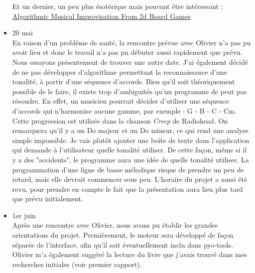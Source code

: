 \documentclass[letterpaper,12pt]{scrartcl}
\begin{document}
\begin{itemize}
Et un dernier, un peu plus ésotérique mais pouvant être intéressant : \href{http://quod.lib.umich.edu/cgi/p/pod/dod-idx/algorithmic-musical-improvisation-from-2d-board-games.pdf?c=icmc;idno=bbp2372.2010.061}{Algorithmic Musical Improvisation From 2d Board Games}\\
	\item 20 mai \\
	En raison d'un problème de santé, la rencontre prévue avec Olivier n'a pas pu avoir lieu et donc le travail n'a pas pu débuter aussi rapidement que prévu. Nous essayons présentement de trouver une autre date. J'ai également décidé de ne pas développer d'algorithme permettant la reconnaissance d'une tonalité, à partir d'une séquence d'accords. Bien qu'il soit théoriquement possible de le faire, il existe trop d'ambiguités qu'un programme de peut pas résoudre. En effet, un musicien pourrait décider d'utiliser une séquence d'accords qui n'harmonise aucune gamme, par exemple : G - B - C - Cm. Cette progression est utilisée dans la chanson \textit{Creep} de Radiohead. On remarquera qu'il y a un Do majeur et un Do mineur, ce qui rend une analyse simple impossible. Je vais plutôt ajouter une boîte de texte dans l'application qui demande à l'utilisateur quelle tonalité utiliser. De cette façon, même si il y a des "accidents", le programme aura une idée de quelle tonalité utiliser. La programmation d'une ligne de basse mélodique risque de prendre un peu de retard, mais elle devrait commencer sous peu. L'horaire du projet a aussi été revu, pour prendre en compte le fait que la présentation aura lieu plus tard que prévu initialement.
	\item 1er juin\\
	Après une rencontre avec Olivier, nous avons pu établir les grandes orientations du projet. Premièrement, le moteur sera développé de façon séparée de l'interface, afin qu'il soit éventuellement inclu dans pyo-tools. Olivier m'a également suggéré la lecture du livre que j'avais trouvé dans mes recherches initiales (voir premier rapport). 


\end{itemize}
\end{document}
